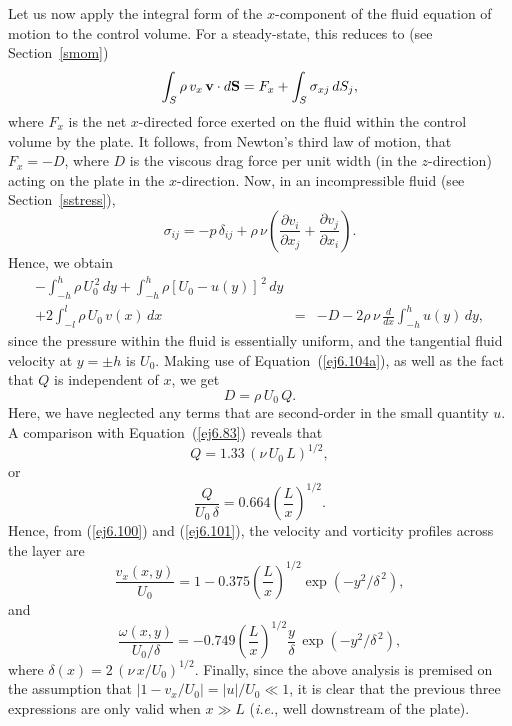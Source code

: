 Let us now apply the integral form of the $x$-component of the fluid equation of motion to the control volume. For a steady-state, 
this reduces to (see Section~\ref{smom})
\begin{equation}
\int_S \rho\,v_x\,{\bf v}\cdot d{\bf S} = F_x + \int_S \sigma_{xj}\,dS_j,
\end{equation}
where $F_x$ is the net $x$-directed force exerted on the fluid within the control volume by the plate. It follows,
from Newton's third law of motion, that
$F_x=-D$, where $D$ is the viscous drag force per unit width (in the $z$-direction) acting on the plate in the $x$-direction. 
Now, in an incompressible fluid (see Section~\ref{sstress}), 
\begin{equation}
\sigma_{ij} = -p\,\delta_{ij} + \rho\,\nu\left(\frac{\partial v_i}{\partial x_j} + \frac{\partial v_j}{\partial x_i}\right).
\end{equation}
Hence, we obtain
\begin{eqnarray}
-\int_{-h}^h\rho\,U_0^{\,2}\,dy+\int_{-h}^h\rho\left[U_0-u(y)\right]^{\,2}\,dy&&\nonumber\\[0.5ex]
+ 2\int_{-l}^l \rho\,U_0\,v(x)\,dx &=& -D -2\rho\,\nu\,\frac{d}{dx}\!\int_{-h}^h u(y)\, dy,
\end{eqnarray}
since the pressure within the fluid is essentially uniform, and the tangential fluid velocity at $y=\pm h$ is $U_0$. Making use of Equation~(\ref{ej6.104a}), as
well as the fact that $Q$ is independent of $x$, we get
\begin{equation}
D = \rho\,U_0\,Q.
\end{equation}
Here, we have neglected any terms that are second-order in the small quantity $u$. 
A comparison with Equation~(\ref{ej6.83}) reveals that
\begin{equation}
Q = 1.33\,(\nu\,U_0\,L)^{1/2},
\end{equation}
or
\begin{equation}
\frac{Q}{U_0\,\delta} = 0.664\left(\frac{L}{x}\right)^{1/2}.
\end{equation}
Hence, from (\ref{ej6.100}) and (\ref{ej6.101}), the velocity and vorticity profiles across the layer are
\begin{equation}
\frac{v_x(x,y)}{U_0} = 1 -0.375\left(\frac{L}{x}\right)^{1/2}\exp(-y^2/\delta^{\,2}),
\end{equation}
and
\begin{equation}
\frac{\omega(x,y)}{U_0/\delta} = -0.749 \left(\frac{L}{x}\right)^{1/2}\frac{y}{\delta}\,\exp(-y^2/\delta^{\,2}),
\end{equation}
where $\delta(x)= 2\,(\nu\,x/U_0)^{1/2}$. Finally, since the above analysis is premised on the assumption that $|1-v_x/U_0|=|u|/U_0\ll 1$,
it is clear that the previous three expressions are only valid when $x\gg L$ ({\em i.e.}, well downstream of the plate).

